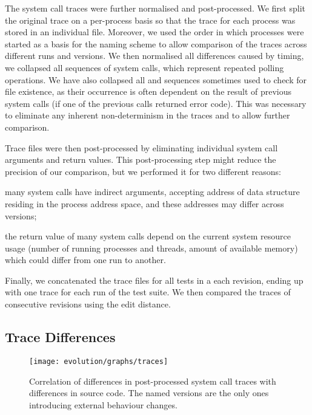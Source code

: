 The system call traces were further normalised and post-processed.  We first
split the original trace on a per-process basis so that the trace for each
process was stored in an individual file.  Moreover, we used the order in which
processes were started as a basis for the naming scheme to allow comparison of
the traces across different runs and versions. We then normalised all
differences caused by timing, \eg we collapsed all sequences of
 system calls, which represent repeated polling
operations.  We have also collapsed all  and
 sequences sometimes used to check for file existence,
as their occurrence is often dependent on the result of previous system calls
(\ie if one of the previous calls returned  error code). This
was necessary to eliminate any inherent non-determinism in the traces and to
allow further comparison.

Trace files were then post-processed by eliminating individual system call
arguments and return values.  This post-processing step might reduce the
precision of our comparison, but we performed it for two different reasons:%
\begin{inparaenum}[(1)]
\item many system calls have indirect arguments, accepting address of data
  structure residing in the process address space, and these addresses may
  differ across versions;
\item the return value of many system calls depend on the current system
  resource usage (\eg number of running processes and threads, amount of
  available memory) which could differ from one run to another.
\end{inparaenum}
Finally, we concatenated the trace files for all tests in a each revision,
ending up with one trace for each run of the test suite. We then compared the
traces of consecutive revisions using the edit distance.

\subsection{Trace Differences}

\begin{figure}[t]
  \begin{center}
    \texttt{[image: evolution/graphs/traces]}
    \caption{Correlation of differences in post-processed system call
      traces with differences in source code. The named versions
      are the only ones introducing external behaviour changes.}
    \label{fig:correlation}
  \end{center}
\end{figure}


